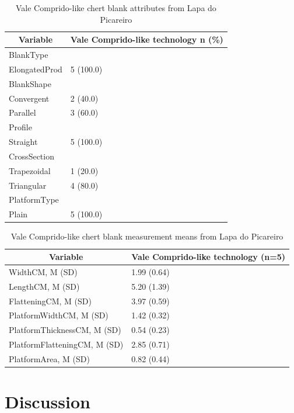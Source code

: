 \documentclass[12pt,twoside]{reedthesis}
\begin{document}
\begin{table}

\caption{\label{tab:VClpAT}Vale Comprido-like chert blank attributes from Lapa do Picareiro}
\centering
\begin{tabular}[t]{ll}
\toprule
\multicolumn{1}{c}{\textbf{Variable}} & \multicolumn{1}{c}{\textbf{Vale Comprido-like technology n (\%)}}\\
\midrule
BlankType & \\
ElongatedProd & 5 (100.0)\\
BlankShape & \\
Convergent & 2 (40.0)\\
Parallel & 3 (60.0)\\
\addlinespace
Profile & \\
Straight & 5 (100.0)\\
CrossSection & \\
Trapezoidal & 1 (20.0)\\
Triangular & 4 (80.0)\\
\addlinespace
PlatformType & \\
Plain & 5 (100.0)\\
\bottomrule
\end{tabular}
\end{table}
\begin{table}

\caption{\label{tab:VClpmean}Vale Comprido-like chert blank measurement means from Lapa do Picareiro}
\centering
\begin{tabular}[t]{ll}
\toprule
\multicolumn{1}{c}{\textbf{Variable}} & \multicolumn{1}{c}{\textbf{Vale Comprido-like technology (n=5)}}\\
\midrule
WidthCM, M (SD) & 1.99 (0.64)\\
LengthCM, M (SD) & 5.20 (1.39)\\
FlatteningCM, M (SD) & 3.97 (0.59)\\
PlatformWidthCM, M (SD) & 1.42 (0.32)\\
PlatformThicknessCM, M (SD) & 0.54 (0.23)\\
\addlinespace
PlatformFlatteningCM, M (SD) & 2.85 (0.71)\\
PlatformArea, M (SD) & 0.82 (0.44)\\
\bottomrule
\end{tabular}
\end{table}
\hypertarget{discussion}{%
\chapter{Discussion}\label{discussion}}
\end{document}

